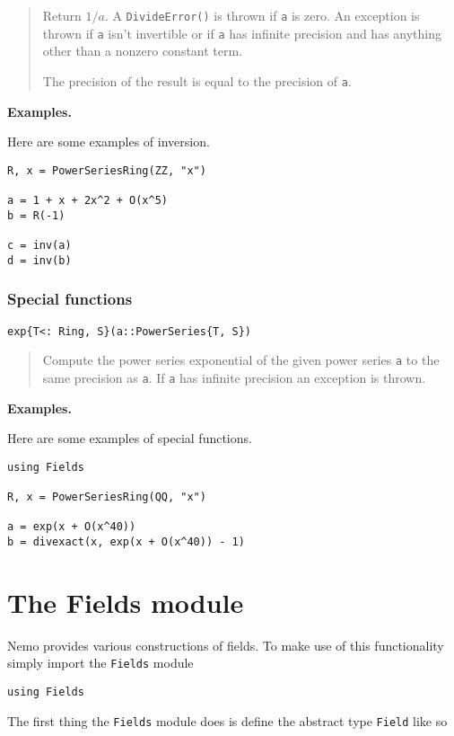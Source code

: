 \documentclass[a4paper,10pt]{article}
\newcommand{\code}{\lstinline}
\newcommand{\desc}[1]{\vspace{-3mm}\begin{quote}#1\end{quote}}
\begin{document}
{{{\desc{Return $1/a$. A \code{DivideError()} is thrown if \code{a} is zero. An
exception is thrown if \code{a} isn't invertible or if \code{a} has infinite
precision and has anything other than a nonzero constant term.

The precision of the result is equal to the precision of \code{a}.}

\textbf{Examples.}

Here are some examples of inversion.

\begin{lstlisting}
R, x = PowerSeriesRing(ZZ, "x")

a = 1 + x + 2x^2 + O(x^5)
b = R(-1)

c = inv(a)
d = inv(b)
\end{lstlisting}

\subsubsection{Special functions}

\begin{lstlisting}
exp{T<: Ring, S}(a::PowerSeries{T, S})
\end{lstlisting}

\desc{Compute the power series exponential of the given power series \code{a}
to the same precision as \code{a}. If \code{a} has infinite precision an
exception is thrown.}

\textbf{Examples.}

Here are some examples of special functions.

\begin{lstlisting}
using Fields

R, x = PowerSeriesRing(QQ, "x")

a = exp(x + O(x^40))
b = divexact(x, exp(x + O(x^40)) - 1)
\end{lstlisting}


\section{The Fields module}

Nemo provides various constructions of fields. To make use of this 
functionality simply import the \code{Fields} module

\begin{lstlisting}
using Fields
\end{lstlisting}

The first thing the \code{Fields} module does is define the abstract
type \code{Field} like so

}}}
\end{document}
